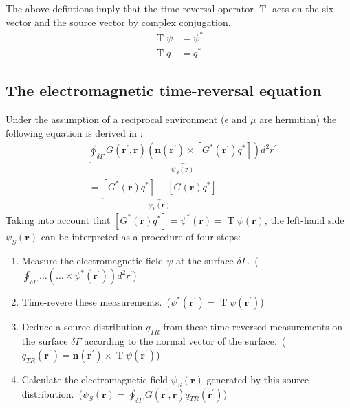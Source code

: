 The above defintions imply that the time-reversal operator \(\operatorname{T}\) acts on the six-vector and the source vector by complex conjugation.
\begin{align}
    \operatorname{T}\psi &= \psi^* \\
    \operatorname{T}q &= q^*
\end{align}

\subsection{The electromagnetic time-reversal equation}
Under the assumption of a reciprocal environment (\(\epsilon \) and \(\mu \) are hermitian) the following equation is derived in \parencite{de_rosny_theory_2010}:
\begin{equation}\label{time-reversal-equation}
    \begin{aligned}
    & \underbrace{\oint_{\delta \Gamma} G(\mathbf{r}^{\prime}, \mathbf{r})\left(\mathbf{n}\left(\mathbf{r}^{\prime}\right) \times\left[G^*\left(\mathbf{r}^{\prime}\right) q^*\right]\right) d^2 r^{\prime}}_{\psi_S(\mathbf{r})} \\
    &=\underbrace{[G^*(\mathbf{r}) q^*] - [G(\mathbf{r}) q^*]}_{\psi_V(\mathbf{r})}
    \end{aligned}
\end{equation}
Taking into account that \([G^*(\mathbf{r}) q^*] = \psi^*(\mathbf{r}) = \operatorname{T}\psi(\mathbf{r})\), the left-hand side \(\psi_S(\mathbf{r})\) can be interpreted as a procedure of four steps:
\begin{enumerate}
    \item Measure the electromagnetic field \(\psi \) at the surface \(\delta \Gamma \).\ (\(\oint_{\delta \Gamma} \ldots  (\ldots \times \psi^*(\mathbf{r}^{\prime})) d^2 r^{\prime}\))
    \item Time-revere these measurements.\ (\(\psi^*(\mathbf{r}^{\prime}) = \operatorname{T}\psi(\mathbf{r}^{\prime})\))
    \item Deduce a source distribution \(q_{TR}\) from these time-reversed measurements on the surface \(\delta \Gamma \) according to the normal vector of the surface.\ (\(q_{TR}(\mathbf{r}^{\prime}) = \mathbf{n}(\mathbf{r}^{\prime}) \times \operatorname{T}\psi(\mathbf{r}^{\prime})\))
    \item Calculate the electromagnetic field \(\psi_S(\mathbf{r})\) generated by this source distribution.\ (\(\psi_S(\mathbf{r}) = \oint_{\delta \Gamma} G(\mathbf{r}^{\prime}, \mathbf{r}) q_{TR}(\mathbf{r}^{\prime})\))
\end{enumerate}
